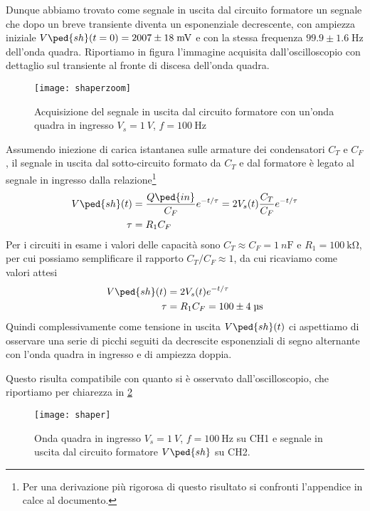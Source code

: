 \documentclass[10pt, a4paper, italian]{article}
\begin{document}
Dunque abbiamo trovato come segnale in uscita dal circuito formatore un
segnale che dopo un breve transiente diventa un esponenziale decrescente,
con ampiezza iniziale $V\ped{sh} (t=0) = 2007 \pm 18 \; \si{m\V}$ e
con la stessa frequenza $99.9 \pm 1.6 \; \si{\Hz}$ dell'onda quadra.
Riportiamo in figura l'immagine acquisita dall'oscilloscopio con dettaglio
sul transiente al fronte di discesa dell'onda quadra.
\begin{figure}[htbp]
    \centering
	\texttt{[image: shaperzoom]}
    \caption{Acquisizione del segnale in uscita dal circuito formatore con
    un'onda quadra in ingresso $V_s = \SI{1}{V}$, $f = \SI{100}{\Hz}$
    \label{fig: shzoom}}
\end{figure}

Assumendo iniezione di carica istantanea sulle armature dei condensatori $C_T$
e $C_F$, il segnale in uscita dal sotto-circuito formato da $C_T$ e dal
formatore è legato al segnale in ingresso dalla relazione\footnote{Per una
derivazione più rigorosa di questo risultato si confronti l'appendice
in calce al documento.}
\begin{align}\label{eq: Vsh}
V\ped{sh}(t) &= \frac{Q\ped{in}}{C_F} e^{-t/\tau} =
2V_s(t) \frac{C_T}{C_F} e^{-t/\tau} \\
\tau &= R_1 C_F
\end{align}
Per i circuiti in esame i valori delle capacità sono
$C_T \approx C_F = \SI{1}{n\F}$ e $R_1 = \SI{100}{\kilo\ohm}$,
per cui possiamo semplificare il rapporto $C_T/C_F \approx 1$, da cui
ricaviamo come valori attesi
\begin{align*}
V\ped{sh}(t) &= 2V_s(t) e^{-t/\tau} \\
\tau &= R_1 C_F = 100 \pm 4 \; \si{\micro\s}
\end{align*}
Quindi complessivamente come tensione in uscita $V\ped{sh} (t)$ ci aspettiamo
di osservare una serie di picchi seguiti da decrescite esponenziali di segno
alternante con l'onda quadra in ingresso e di ampiezza doppia.

Questo risulta compatibile con quanto si è osservato dall'oscilloscopio, che
riportiamo per chiarezza in \cref{fig: shaper}
\begin{figure}[htbp]
    \centering
	\texttt{[image: shaper]}
    \caption{Onda quadra in ingresso $V_s = \SI{1}{V}$, $f = \SI{100}{\Hz}$
    su CH1 e segnale in uscita dal circuito formatore $V\ped{sh}$ su CH2.
    \label{fig: shaper}}
\end{figure}
\end{document}
